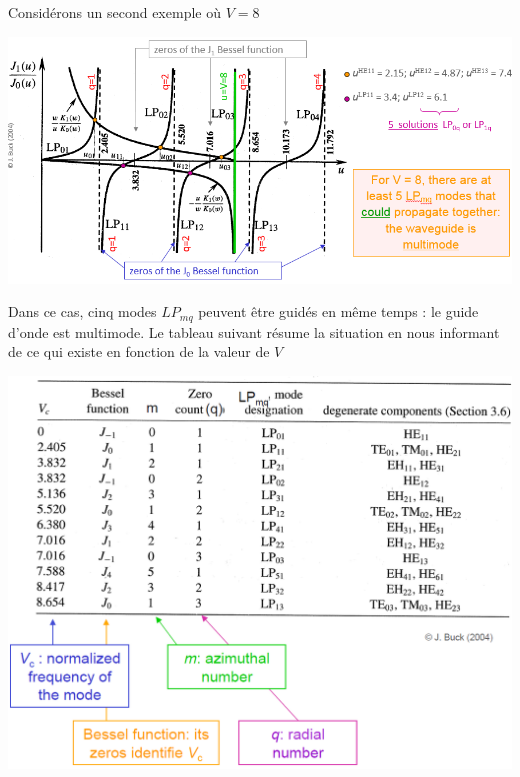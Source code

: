 Considérons un second exemple où $V=8$
\begin{center}
	\includegraphics[scale=0.64]{ch1/image23}
\end{center}
Dans ce cas, cinq modes $LP_{mq}$ peuvent être guidés en même temps : le guide d'onde est
multimode. Le tableau suivant résume la situation en nous informant de ce qui existe en fonction
de la valeur de $V$
\begin{center}
	\includegraphics[scale=0.45]{ch1/tab1}
\end{center}



